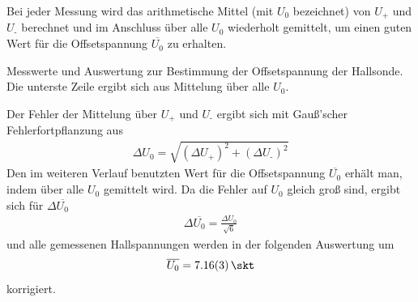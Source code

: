 \documentclass[11pt, a4paper]{article}
\numberwithin{equation}{section}
\begin{document}
Bei jeder Messung wird das arithmetische Mittel (mit $U_0$ bezeichnet) von $U_\text{+}$ und $U_\text{-}$ berechnet und im Anschluss über alle $U_0$ wiederholt gemittelt, um einen guten Wert für die Offsetspannung $\overline{U_0}$ zu erhalten.
\begin{table}[h]
	\centering
	
	\caption{Messwerte und Auswertung zur Bestimmung der Offsetspannung der Hallsonde. Die unterste Zeile ergibt sich aus Mittelung über alle $U_0$.}
	\label{tab:offset}
\end{table}
Der Fehler der Mittelung über $U_\text{+}$ und $U_\text{-}$ ergibt sich mit Gauß'scher Fehlerfortpflanzung aus
\begin{align}
	\Delta U_0 = \sqrt{(\Delta U_\text{+})^2 + (\Delta U_\text{-})^2}
\end{align}
Den im weiteren Verlauf benutzten Wert für die Offsetspannung $\overline{U_0}$ erhält man, indem über alle $U_0$ gemittelt wird. Da die Fehler auf $U_0$ gleich groß sind, ergibt sich für $\Delta\overline{U_0}$
\begin{align}
	\Delta\overline{U_0} = \frac{\Delta U_0}{\sqrt{6}}
\end{align}
und alle gemessenen Hallspannungen werden in der folgenden Auswertung um
\begin{align}
	\overline{U_0} = \SI{7.16 +- 0.03}{\skt}
	\label{hall_korrektur}
\end{align}
korrigiert.
\end{document}
